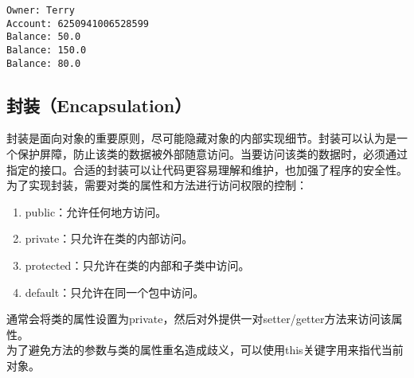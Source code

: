 \begin{tcolorbox}
    \begin{verbatim}
Owner: Terry
Account: 6250941006528599
Balance: 50.0
Balance: 150.0
Balance: 80.0
\end{verbatim}
\end{tcolorbox}

\vspace{0.5cm}

\subsection{封装（Encapsulation）}

封装是面向对象的重要原则，尽可能隐藏对象的内部实现细节。封装可以认为是一个保护屏障，防止该类的数据被外部随意访问。当要访问该类的数据时，必须通过指定的接口。合适的封装可以让代码更容易理解和维护，也加强了程序的安全性。\\

为了实现封装，需要对类的属性和方法进行访问权限的控制：

\begin{enumerate}
    \item public：允许任何地方访问。
    \item private：只允许在类的内部访问。
    \item protected：只允许在类的内部和子类中访问。
    \item default：只允许在同一个包中访问。
\end{enumerate}

通常会将类的属性设置为private，然后对外提供一对setter/getter方法来访问该属性。\\

为了避免方法的参数与类的属性重名造成歧义，可以使用this关键字用来指代当前对象。\\


